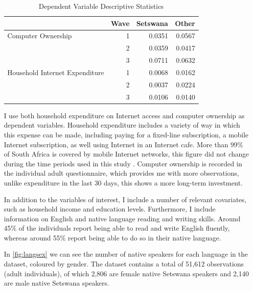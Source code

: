 \documentclass[a4paper,british]{article}\usepackage[]{graphicx}\usepackage[]{color}
\providecommand{\tabularnewline}{\\}
\let\ref\autoref
\begin{document}
\begin{table}[H]

\caption{Dependent Variable Descriptive Statistics}

\begin{centering}
\begin{tabular}{|l|r|r|r|}
\hline 
 &
Wave &
Setswana &
Other\tabularnewline
\hline 
\hline 
Computer Ownership &
1 &
0.0351 &
0.0567\tabularnewline
\hline 
 &
2 &
0.0359 &
0.0417\tabularnewline
\hline 
 &
3 &
0.0711 &
0.0632\tabularnewline
\hline 
Household Internet Expenditure &
1 &
0.0068 &
0.0162\tabularnewline
\hline 
 &
2 &
0.0037 &
0.0224\tabularnewline
\hline 
 &
3 &
0.0106 &
0.0140\tabularnewline
\hline 
\end{tabular}
\par\end{centering}
\end{table}

I use both household expenditure on Internet access and computer ownership
as dependent variables. Household expenditure includes a variety of
way in which this expense can be made, including paying for a fixed-line
subscription, a mobile Internet subscription, as well using Internet
in an Internet cafe. More than 99\% of South Africa is covered by
mobile Internet networks, this figure did not change during the time
periods used in this study \citep{international2015world}. Computer
ownership is recorded in the individual adult questionnaire, which
provides me with more observations, unlike expenditure in the last
30 days, this shows a more long-term investment.

In addition to the variables of interest, I include a number of relevant
covariates, such as household income and education levels. Furthermore,
I include information on English and native language reading and writing
skills. Around 45\% of the individuals report being able to read and
write English fluently, whereas around 55\% report being able to do
so in their native language.

In \ref{fig:langsex} we can see the number of native speakers for
each language in the dataset, coloured by gender. The dataset contains
a total of 51,612 observations (adult individuals), of which 2,806
are female native Setswana speakers and 2,140 are male native Setswana
speakers.
\end{document}
